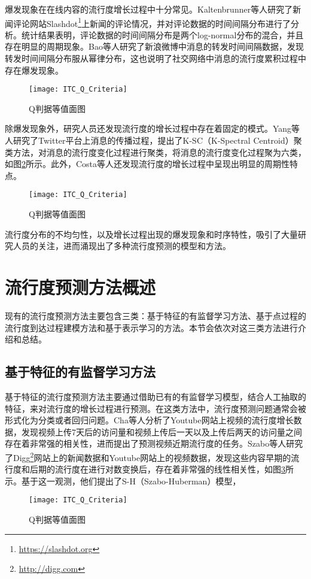 爆发现象在在线内容的流行度增长过程中十分常见。Kaltenbrunner等人\citep{chen2005zhulu}研究了新闻评论网站Slashdot\footnote{\url{https://slashdot.org}}上新闻的评论情况，并对评论数据的时间间隔分布进行了分析。统计结果表明，评论数据的时间间隔分布是两个log-normal分布的混合，并且存在明显的周期现象。Bao等人\citep{chen2005zhulu}研究了新浪微博中消息的转发时间间隔数据，发现转发时间间隔分布服从幂律分布，这也说明了社交网络中消息的流行度累积过程中存在爆发现象。
\begin{figure}[!htbp]
  \centering
  \texttt{[image: ITC\_Q\_Criteria]}
  \caption{Q判据等值面图}
  \label{fig:burst}
\end{figure}

除爆发现象外，研究人员还发现流行度的增长过程中存在着固定的模式。Yang等人\citep{chen2005zhulu}研究了Twitter平台上消息的传播过程，提出了K-SC（K-Spectral Centroid）聚类方法，对消息的流行度变化过程进行聚类，将消息的流行度变化过程聚为六类，如图\ref{fig:pattern}所示。此外，Costa等人\citep{chen2005zhulu}还发现流行度的增长过程中呈现出明显的周期性特点。
\begin{figure}[!htbp]
  \centering
  \texttt{[image: ITC\_Q\_Criteria]}
  \caption{Q判据等值面图}
  \label{fig:pattern}
\end{figure}

流行度分布的不均匀性，以及增长过程出现的爆发现象和时序特性，吸引了大量研究人员的关注，进而涌现出了多种流行度预测的模型和方法。
\section{流行度预测方法概述}
现有的流行度预测方法主要包含三类：基于特征的有监督学习方法、基于点过程的流行度到达过程建模方法和基于表示学习的方法。本节会依次对这三类方法进行介绍和总结。
\subsection{基于特征的有监督学习方法}
基于特征的流行度预测方法主要通过借助已有的有监督学习模型，结合人工抽取的特征，来对流行度的增长过程进行预测。在这类方法中，流行度预测问题通常会被形式化为分类或者回归问题。Cha等人\citep{chen2005zhulu}分析了Youtube网站上视频的流行度增长数据，发现视频上传7天后的访问量和视频上传后一天以及上传后两天的访问量之间存在着非常强的相关性，进而提出了预测视频近期流行度的任务。Szabo等人\citep{chen2005zhulu}研究了Digg\footnote{\url{http://digg.com}}网站上的新闻数据和Youtube网站上的视频数据，发现这些内容早期的流行度和后期的流行度在进行对数变换后，存在着非常强的线性相关性，如图\ref{fig:loglinear}所示。基于这一观测，他们提出了S-H（Szabo-Huberman）模型，
\begin{figure}[!htbp]
  \centering
  \texttt{[image: ITC\_Q\_Criteria]}
  \caption{Q判据等值面图}
  \label{fig:loglinear}
\end{figure}

